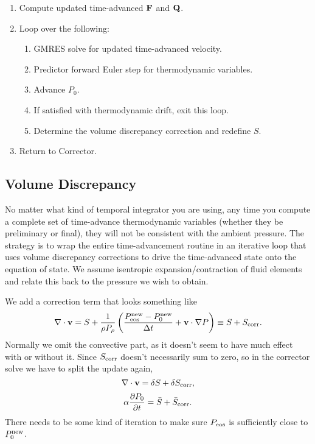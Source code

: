 \documentclass[final]{siamltex}
\def\Fb {{\bf F}}
\def\Qb {{\bf Q}}
\def\vb {{\bf v}}
\begin{document}
\begin{enumerate}
\item Compute updated time-advanced $\Fb$ and $\Qb$.
\item Loop over the following:
\begin{enumerate}
\item GMRES solve for updated time-advanced velocity.
\item Predictor forward Euler step for thermodynamic variables.
\item Advance $P_0$.
\item If satisfied with thermodynamic drift, exit this loop.
\item Determine the volume discrepancy correction and redefine $S$.
\end{enumerate}
\item Return to Corrector.
\end{enumerate}

\subsection{Volume Discrepancy}
No matter what kind of temporal integrator you are using, any time you compute a
complete set of time-advance thermodynamic variables (whether they be preliminary
or final), they will not be consistent with the ambient pressure.  The strategy
is to wrap the entire time-advancement routine in an iterative loop that uses
volume discrepancy corrections to drive the time-advanced state onto the
equation of state.  We assume isentropic expansion/contraction of fluid elements
and relate this back to the pressure we wish to obtain.

We add a correction term that looks something like
\begin{equation}
\nabla\cdot\vb = S + \frac{1}{\rho P_\rho}\left(\frac{P_{\rm eos}^{\rm new} - P_0^{\rm new}}{\Delta t} + \vb\cdot\nabla P\right) \equiv S + S_{\rm corr}.
\end{equation}
Normally we omit the convective part, as it doesn't seem to have much effect with or
without it.  Since $S_{\rm corr}$ doesn't necessarily sum to zero, so in the 
corrector solve we have to split the update again,
\begin{equation}
\nabla\cdot\vb = \delta S + \delta S_{\rm corr},
\end{equation}
\begin{equation}
\alpha\frac{\partial P_0}{\partial t} = \bar{S} + \bar{S}_{\rm corr}.
\end{equation}
There needs to be some kind of iteration to make sure $P_{\rm eos}$ is sufficiently
close to $P_0^{\rm new}$.
\end{document}
